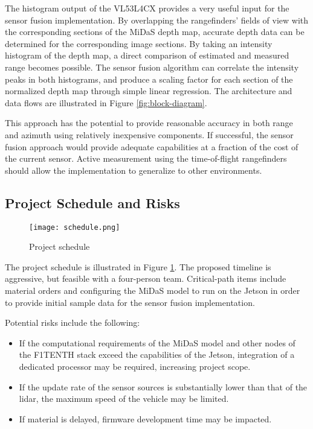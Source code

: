 \documentclass[conference]{IEEEtran}
\begin{document}
\FloatBarrier

The histogram output of the VL53L4CX provides a very useful input for the
sensor fusion implementation. By overlapping the rangefinders' fields of view
with the corresponding sections of the MiDaS depth map, accurate depth data can
be determined for the corresponding image sections. By taking an intensity
histogram of the depth map, a direct comparison of estimated and measured range
becomes possible. The sensor fusion algorithm can correlate the intensity peaks
in both histograms, and produce a scaling factor for each section of the
normalized depth map through simple linear regression. The architecture and
data flows are illustrated in Figure \ref{fig:block-diagram}.

This approach has the potential to provide reasonable accuracy in both range
and azimuth using relatively inexpensive components. If successful, the sensor
fusion approach would provide adequate capabilities at a fraction of the cost
of the current sensor. Active measurement using the time-of-flight rangefinders
should allow the implementation to generalize to other environments.


\subsection{Project Schedule and Risks}

\FloatBarrier

\begin{figure}
\centering
\texttt{[image: schedule.png]}
\caption{Project schedule}
\label{fig:schedule}
\end{figure}

The project schedule is illustrated in Figure \ref{fig:schedule}. The proposed
timeline is aggressive, but feasible with a four-person team. Critical-path
items include material orders and configuring the MiDaS model to run on the
Jetson in order to provide initial sample data for the sensor fusion
implementation.

Potential risks include the following:
\begin{itemize}
\item If the computational requirements of the MiDaS model and other nodes of
the F1TENTH stack exceed the capabilities of the Jetson, integration of a
dedicated processor may be required, increasing project scope.

\item If the update rate of the sensor sources is substantially lower than that
of the lidar, the maximum speed of the vehicle may be limited.

\item If material is delayed, firmware development time may be impacted.
\end{itemize}
\end{document}
